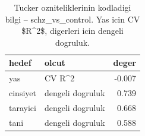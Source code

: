 \begin{table}[htbp]
  \centering
  \caption{Tucker ozniteliklerinin kodladigi bilgi -- schz\_vs\_control. Yas icin CV \$R\textasciicircum{}2\$, digerleri icin dengeli dogruluk.}
  \label{tab:content_schz_vs_control}
  \small
  \begin{tabular}{llr}
    \toprule
    hedef & olcut & deger \\
    \midrule
    yas & CV R\textasciicircum{}2 & -0.007 \\
    cinsiyet & dengeli dogruluk & 0.739 \\
    tarayici & dengeli dogruluk & 0.668 \\
    tani & dengeli dogruluk & 0.588 \\
    \bottomrule
  \end{tabular}
\end{table}
